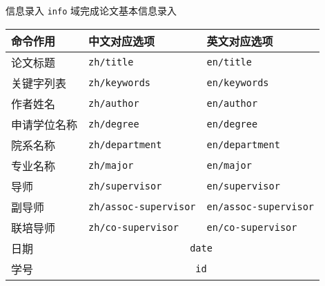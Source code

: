 \begin{frame}[fragile]{信息录入}
  \verb|info| 域完成论文基本信息录入
  \begin{table}[h]
    \centering
    \footnotesize
    \begin{tabular}{lll} \toprule
      命令作用   & 中文对应选项                            & 英文对应选项                       \\ \midrule
      论文标题   & \texttt{zh/title}                 & \texttt{en/title}            \\
      关键字列表  & \texttt{zh/keywords}              & \texttt{en/keywords}         \\
      作者姓名   & \texttt{zh/author}                & \texttt{en/author}           \\
      申请学位名称 & \texttt{zh/degree}                & \texttt{en/degree}           \\
      院系名称   & \texttt{zh/department}            & \texttt{en/department}       \\
      专业名称   & \texttt{zh/major}                 & \texttt{en/major}            \\
      导师     & \texttt{zh/supervisor}            & \texttt{en/supervisor}       \\
      副导师    & \texttt{zh/assoc-supervisor}      & \texttt{en/assoc-supervisor} \\
      联培导师   & \texttt{zh/co-supervisor}         & \texttt{en/co-supervisor}    \\
      日期     & \multicolumn{2}{c}{\texttt{date}}                                \\
      学号     & \multicolumn{2}{c}{\texttt{id}}                                  \\ \bottomrule
    \end{tabular}
  \end{table}
\end{frame}

